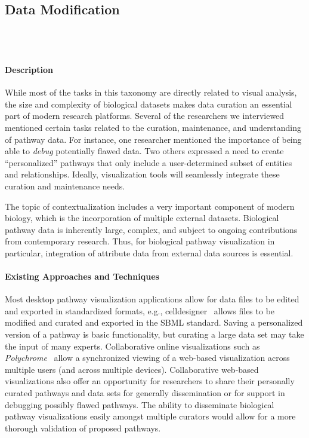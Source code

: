 \documentclass[twocolumn]{bmcart}%
\begin{document}
\subsection*{Data Modification}

\ \\ \
\paragraph*{Description}

While most of the tasks in this taxonomy are directly related to visual analysis, the size and complexity of biological datasets makes data curation an essential part of modern research platforms.
Several of the researchers we interviewed mentioned certain tasks related to the curation, maintenance, and understanding of pathway data.
For instance, one researcher mentioned the importance of being able to \emph{debug} potentially flawed data.
Two others expressed a need to create ``personalized'' pathways that only include a user-determined subset of entities and relationships. Ideally, visualization tools will seamlessly integrate these curation and maintenance needs.

The topic of contextualization includes a very important component of modern biology, which is the incorporation of multiple external datasets.
Biological pathway data is inherently large, complex, and subject to ongoing contributions from contemporary research.
Thus, for biological pathway visualization in particular, integration of attribute data from external data sources is essential.

\paragraph*{Existing Approaches and Techniques}
Most desktop pathway visualization applications allow for data files to be edited and exported in standardized formats, e.g., celldesigner~\cite{funahashi2008celldesigner} allows files to be modified and curated and exported in the SBML standard.
Saving a  personalized version of a pathway is basic functionality, but curating a large data set may take the input of many experts.
Collaborative online visualizations such as \textit{Polychrome}~\cite{badam2014polychrome} allow a synchronized viewing of a web-based visualization across multiple users (and across multiple devices).
Collaborative web-based visualizations also offer an opportunity for researchers to share their personally curated pathways and data sets for generally dissemination or for support in debugging possibly flawed pathways.
The ability to disseminate biological pathway visualizations easily amongst multiple curators would allow for a more thorough validation of proposed pathways.
\end{document}
